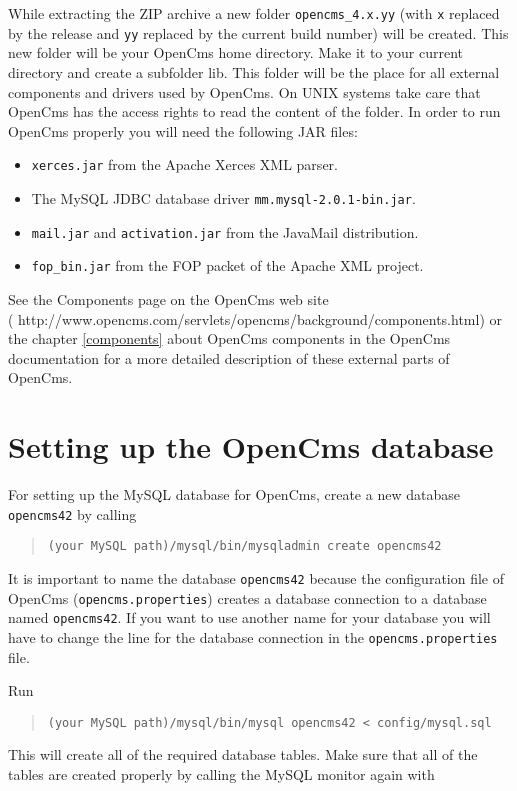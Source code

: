 While extracting the ZIP archive
a new folder \texttt{opencms\_4.x.yy} (with \texttt{x} replaced by the release and \texttt{yy}
replaced by the current build number) will be created. This new folder will be your OpenCms home
directory. Make it to your current directory and create a subfolder lib.
This folder will be the place for all external components and drivers used by OpenCms. 
On UNIX systems take care that OpenCms has the access rights to read the content
of the folder. In order to run OpenCms properly
you will need the following JAR files:

\begin{itemize}
\item \texttt{xerces.jar} from the Apache Xerces XML parser. 
\item The MySQL JDBC database driver \texttt{mm.mysql-2.0.1-bin.jar}.
\item \texttt{mail.jar} and \texttt{activation.jar} from the JavaMail distribution.
\item \texttt{fop\_bin.jar} from the FOP packet of the Apache XML project.
\end{itemize}

See the Components page on the OpenCms web site \\
(
{http://www.opencms.com/servlets/opencms/background/components.html}) 
or the chapter \ref{components} about OpenCms components in the OpenCms documentation 
for a more detailed description of these external parts of OpenCms.


\section{\label{42dbsetup}Setting up the OpenCms database}
For setting up the MySQL database for OpenCms, create a new database \texttt{opencms42}
by calling

\begin{quote}
\texttt{(your MySQL path)/mysql/bin/mysqladmin create opencms42}
\end{quote}

It is important to name the database \texttt{opencms42} because the configuration file of
OpenCms (\texttt{opencms.properties}) creates a database connection to a database named \texttt{opencms42}.
If you want to use another name for your database
you will have to change the line for the database connection in the \texttt{opencms.properties} file.

Run
\begin{quote}
\texttt{(your MySQL path)/mysql/bin/mysql opencms42 < config/mysql.sql}
\end{quote}
This will create all of the required database tables. 
Make sure that all of the tables are created properly by calling the MySQL monitor again with

